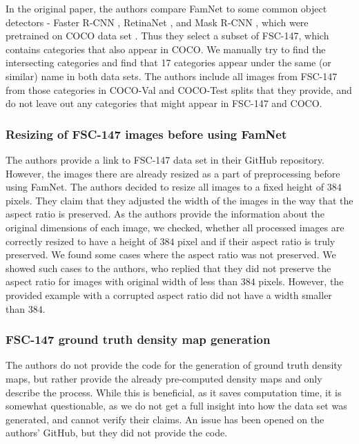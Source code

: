In the original paper, the authors compare FamNet to some common object detectors - Faster R-CNN \cite{ren2015faster}, RetinaNet \cite{lin2017focal}, and Mask R-CNN \cite{he2017mask}, which were pretrained on COCO data set \cite{lin2014microsoft}. Thus they select a subset of FSC-147, which contains categories that also appear in COCO. We manually try to find the intersecting categories and find that 17 categories appear under the same (or similar) name in both data sets. The authors include all images from FSC-147 from those categories in COCO-Val and COCO-Test splits that they provide, and do not leave out any categories that might appear in FSC-147 and COCO.

\subsubsection{Resizing of FSC-147 images before using FamNet}
The authors provide a link to FSC-147 data set in their GitHub repository. However, the images there are already resized as a part of preprocessing before using FamNet. The authors decided to resize all images to a fixed height of $384$ pixels. They claim that they adjusted the width of the images in the way that the aspect ratio is preserved.
As the authors provide the information about the original dimensions of each image, we checked, whether all processed images are correctly resized to have a height of $384$ pixel and if their aspect ratio is truly preserved. We found some cases where the aspect ratio was not preserved. We showed such cases to the authors, who replied that they did not preserve the aspect ratio for images with original width of less than $384$ pixels. However, the provided example with a corrupted aspect ratio did not have a width smaller than $384$.

\subsubsection{FSC-147 ground truth density map generation}
\label{sec:density_maps}
The authors do not provide the code for the generation of ground truth density maps, but rather provide the already pre-computed density maps and only describe the process. While this is beneficial, as it saves computation time, it is somewhat questionable, as we do not get a full insight into how the data set was generated, and cannot verify their claims. An issue has been opened on the authors' GitHub, but they did not provide the code.

